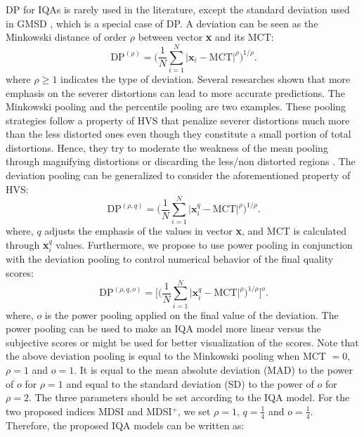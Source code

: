 DP for IQAs is rarely used in the literature, except the standard deviation used in GMSD \cite{GMSD}, which is a special case of DP. A deviation can be seen as the Minkowski distance of order $\rho$ between vector \textbf{x} and its MCT:  
\begin{equation}
  \ \text{DP}^{(\rho)} = \Big( \frac{1}{N} \sum_{i=1}^{N}\big| \textbf{x}_i - \text{MCT} \big|^\rho \Big)^{1/\rho}.
  \label{equ:minkowski1}
\end{equation}                    
where $\rho \geq 1$ indicates the type of deviation. Several researches shown that more emphasis on the severer distortions can lead to more accurate predictions. The Minkowski pooling \cite{spatial2006} and the percentile pooling \cite{percentile2009} are two examples. These pooling strategies follow a property of HVS that penalize severer distortions much more than the less distorted ones even though they constitute a small portion of total distortions. Hence, they try to moderate the weakness of the mean pooling through magnifying distortions \cite{spatial2006} or discarding the less/non distorted regions \cite{percentile2009}. The deviation pooling can be generalized to consider the aforementioned property of HVS:
\begin{equation}
  \ \text{DP}^{(\rho, q)} = \Big( \frac{1}{N} \sum_{i=1}^{N}\big| \textbf{x}_i^q - \text{MCT} \big|^\rho \Big)^{1/\rho}.
  \label{equ:DP}
\end{equation}                    
where, $q$ adjusts the emphasis of the values in vector \textbf{x}, and MCT is calculated through \textbf{x}$_i^q$ values. Furthermore, we propose to use power pooling in conjunction with the deviation pooling to control numerical behavior of the final quality scores:
\begin{equation}
  \ \text{DP}^{(\rho, q, o)} = \bigg[ \Big( \frac{1}{N} \sum_{i=1}^{N}\big| \textbf{x}_i^q - \text{MCT} \big|^\rho \Big)^{1/\rho} \bigg]^o.
  \label{equ:DP}
\end{equation}                    
where, $o$ is the power pooling applied on the final value of the deviation. The power pooling can be used to make an IQA model more linear versus the subjective scores or might be used for better visualization of the scores. Note that the above deviation pooling is equal to the Minkowski pooling \cite{spatial2006} when MCT $=0$, $\rho=1$ and $o=1$. It is equal to the mean absolute deviation (MAD) to the power of $o$ for $\rho=1$ and equal to the standard deviation (SD) to the power of $o$ for $\rho=2$. The three parameters should be set according to the IQA model. For the two proposed indices MDSI and MDSI$^+$, we set $\rho=1$, $q=\frac{1}{4}$ and $o=\frac{1}{4}$. Therefore, the proposed IQA models can be written as:

